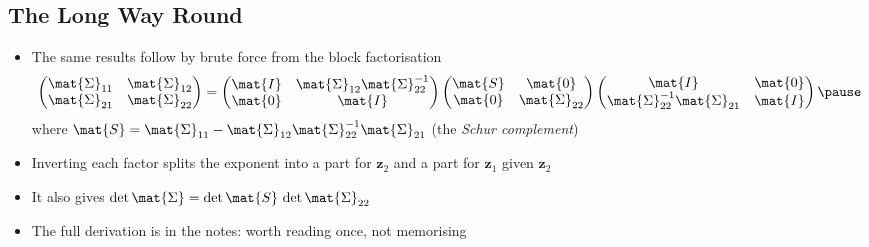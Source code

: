 \begin{slide}
\section[-2]{The Long Way Round}

\begin{PauseHighLight}
  \begin{itemize}
  \item The same results follow by brute force from the block
    factorisation
    \begin{align*}
      \begin{pmatrix}\mat{\Sigma}_{11} & \mat{\Sigma}_{12}\\
        \mat{\Sigma}_{21} & \mat{\Sigma}_{22}\end{pmatrix}
      = \begin{pmatrix}\mat{I} & \mat{\Sigma}_{12}\mat{\Sigma}_{22}^{-1}\\
        \mat{0} & \mat{I}\end{pmatrix}
      \begin{pmatrix}\mat{S} & \mat{0}\\ \mat{0} & \mat{\Sigma}_{22}\end{pmatrix}
      \begin{pmatrix}\mat{I} & \mat{0}\\
        \mat{\Sigma}_{22}^{-1}\mat{\Sigma}_{21} & \mat{I}\end{pmatrix}\pause
    \end{align*}
    where $\mat{S} = \mat{\Sigma}_{11} -
    \mat{\Sigma}_{12}\mat{\Sigma}_{22}^{-1}\mat{\Sigma}_{21}$ (the
    \emph{Schur complement})\pause
  \item Inverting each factor splits the exponent into a part for
    $\bm{z}_2$ and a part for $\bm{z}_1$ given $\bm{z}_2$\pause
  \item It also gives $\det\mat{\Sigma} = \det\mat{S}\,\det\mat{\Sigma}_{22}$\pause
  \item The full derivation is in the notes: worth reading once, not
    memorising\pause
  \end{itemize}
\end{PauseHighLight}

\end{slide}

\Outline %


